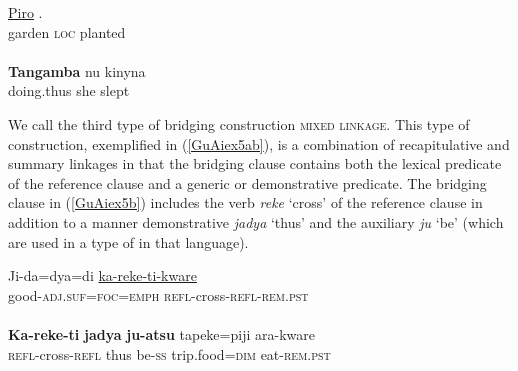 \documentclass[output=paper]{LSP/langsci}
\begin{document}
\begin{exe}
	\ex	\label{GuAiex4ab}
\begin{xlist}
\ex	\label{GuAiex4a}
\gll		 \underline{Piro}   \underline{}   \underline{}.  \\
			garden  \textsc{loc}  planted\\
		\glt	{} \\
		\ex	\label{GuAiex4b}
\gll \textbf{Tangamba} nu   kinyna\\
doing.thus   she   slept \\
		\glt	{} 
		\end{xlist}
\end{exe}


We call the third type of bridging construction \textsc{mixed linkage}. This type of construction, exemplified in (\ref{GuAiex5ab}), is a combination of recapitulative and summary linkages in that the bridging clause contains both the lexical predicate of the reference clause and a generic or demonstrative predicate.  The bridging clause in (\ref{GuAiex5b}) includes the verb \textit{reke} `cross' of the reference clause in addition to a manner demonstrative \textit{jadya} `thus' and the auxiliary \textit{ju} `be' (which are used in a type of  in that language).

\begin{exe}
	\ex	\label{GuAiex5ab}
\begin{xlist}
\ex	\label{GuAiex5a}
\gll		Ji-da=dya=di       \underline{ka-reke-ti-kware}  \\
good-\textsc{adj.suf}=\textsc{foc}=\textsc{emph}   \textsc{refl}-cross-\textsc{refl}-\textsc{rem.pst} \\
\glt	{} \\
\ex	\label{GuAiex5b}
\gll \textbf{Ka-reke-ti}      \textbf{jadya}   \textbf{ju-atsu} tapeke=piji   ara-kware\\
\textsc{refl}-cross-\textsc{refl}   thus   be-\textsc{ss}     trip.food=\textsc{dim}   eat-\textsc{rem.pst}\\
\glt	{} 
\end{xlist}
\end{exe}
\end{document}
